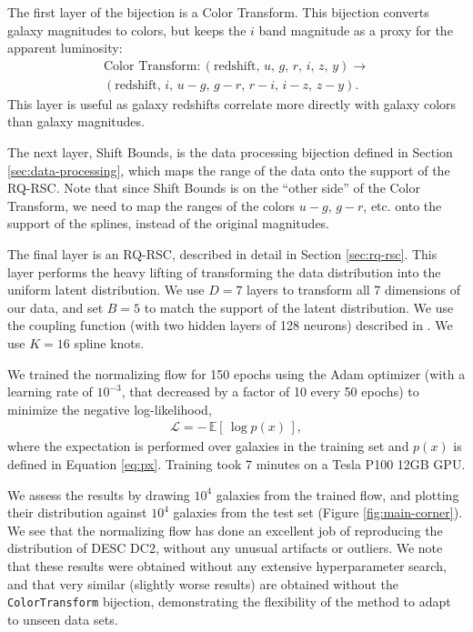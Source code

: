 \documentclass[twocolumn]{aastex631}
\begin{document}
The first layer of the bijection is a Color Transform.
This bijection converts galaxy magnitudes to colors, but keeps the $i$ band magnitude as a proxy for the apparent luminosity:
\begin{multline}
    \text{Color Transform} : (\text{redshift},\, u,\, g,\, r,\, i,\, z,\, y) \to \\
    (\text{redshift},\, i,\, u-g,\, g-r,\, r-i,\, i-z,\, z-y).
\end{multline}
This layer is useful as galaxy redshifts correlate more directly with galaxy colors than galaxy magnitudes.

The next layer, Shift Bounds, is the data processing bijection defined in Section \ref{sec:data-processing}, which maps the range of the data onto the support of the RQ-RSC.
Note that since Shift Bounds is on the ``other side'' of the Color Transform, we need to map the ranges of the colors $u-g$, $g-r$, etc. onto the support of the splines, instead of the original magnitudes.

The final layer is an RQ-RSC, described in detail in Section \ref{sec:rq-rsc}.
This layer performs the heavy lifting of transforming the data distribution into the uniform latent distribution.
We use $D=7$ layers to transform all 7 dimensions of our data, and set $B=5$ to match the support of the latent distribution.
We use the coupling function (with two hidden layers of 128 neurons) described in \citet{durkan2019}.
We use $K=16$ spline knots.

We trained the normalizing flow for 150 epochs using the Adam optimizer \citep{adam} (with a learning rate of $10^{-3}$, that decreased by a factor of 10 every 50 epochs) to minimize the negative log-likelihood,
\begin{align}
    \mathcal{L} = - \, \mathbb{E}[ \, \log p(x) \, ],
\end{align}
where the expectation is performed over galaxies in the training set and $p(x)$ is defined in Equation \ref{eq:px}.
Training took 7 minutes on a Tesla P100 12GB GPU.

We assess the results by drawing $10^4$ galaxies from the trained flow, and plotting their distribution against  $10^4$ galaxies from the test set (Figure \ref{fig:main-corner}).
We see that the normalizing flow has done an excellent job of reproducing the distribution of DESC DC2, without any unusual artifacts or outliers.
We note that these results were obtained without any extensive hyperparameter search, and that very similar (slightly worse results) are obtained without the \texttt{ColorTransform} bijection, demonstrating the flexibility of the method to adapt to unseen data sets.
\end{document}
